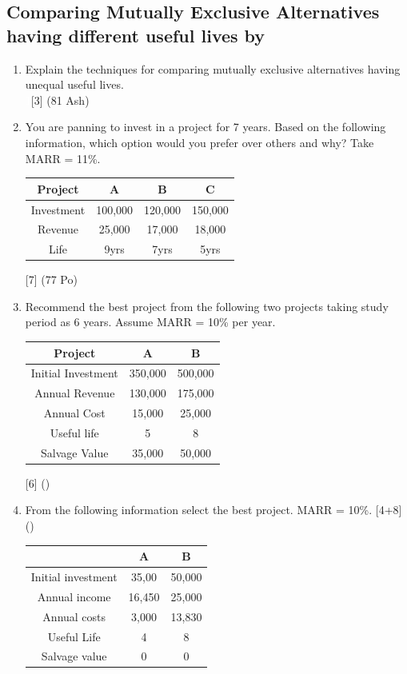 \documentclass[12pt]{article}
\newcommand{\enter}{\\\textcolor{white}{1}}
\begin{document}
	\subsection{Comparing Mutually Exclusive Alternatives having different useful lives by}
		\begin{enumerate}
			\item Explain the techniques for comparing mutually exclusive alternatives having unequal useful lives. 
			\enter\hfill [3] (81 Ash)
			
			\item You are panning to invest in a project for 7 years. Based on the following information, which option would you prefer over others and why? Take MARR = 11\%. \\
			\begin{tabular}{|c|c|c|c|}
				\hline
				Project & A & B & C \\ \hline
				Investment & 100,000 & 120,000 & 150,000 \\ \hline
				Revenue & 25,000 & 17,000 & 18,000 \\ \hline
				Life & 9yrs & 7yrs & 5yrs \\ \hline
			\end{tabular}\hfill [7] (77 Po)
			
			\item Recommend the best project from the following two projects taking study period as 6 years. Assume MARR = 10\% per year.\\
			\begin{tabular}{|c|c|c|}
				\hline
				Project & A & B \\ \hline
				Initial Investment & 350,000 & 500,000 \\ \hline
				Annual Revenue & 130,000 & 175,000 \\ \hline
				Annual Cost & 15,000 & 25,000 \\ \hline
				Useful life & 5 & 8 \\ \hline
				Salvage Value & 35,000 & 50,000 \\ \hline
			\end{tabular}\hfill [6] ()
			
			\item From the following information select the best project. MARR = 10\%. \hfill [4+8] ()
			\begin{tabular}{|c|c|c|}
				\hline
				& A & B \\ \hline
				Initial investment & 35,00 & 50,000 \\ \hline
				Annual income & 16,450 & 25,000 \\ \hline
				Annual costs & 3,000 & 13,830 \\ \hline
				Useful Life & 4 & 8 \\ \hline
				Salvage value & 0 & 0 \\ \hline
			\end{tabular}
			

\end{enumerate}
\end{document}

